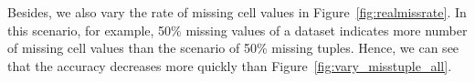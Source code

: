 Besides, we also vary the rate of missing cell values in Figure~\ref{fig:realmissrate}. In this scenario, for example, 50\% missing values of a dataset  indicates more number of missing cell values than the scenario of 50\% missing tuples. Hence, we can see that the accuracy decreases more quickly than Figure~\ref{fig:vary_misstuple_all}.



